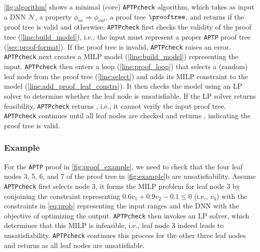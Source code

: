 \documentclass[oneside,11pt,dvipsnames]{book}
\newcommand{\nnproofcheck}{\texttt{APTPcheck}}
\newcommand{\nnproofformat}{\texttt{APTP}}
\newcommand{\mycomment}[3][\color{blue}]{{#1{{#2}: {#3}}}}
\newcommand{\tvn}[1]{\mycomment{TVN}{#1}}{}
\begin{document}
\autoref{fig:algorithm} shows a minimal (core)  \nnproofcheck{} algorithm, which takes as input a DNN $\mathcal{N}$, a property $\phi_{in} \Rightarrow \phi_{out}$, a proof tree $\prooftree$, and returns \certified if the proof tree is valid and \uncertified otherwise. 
\nnproofcheck{} first checks the validity of the proof tree (\autoref{line:build_model}), i.e., the input must represent a proper \nnproofformat{} proof tree (\autoref{sec:proof-format}).  
If the proof tree is invalid, \nnproofcheck{} raises an error.
\nnproofcheck{} next creates a MILP model (\autoref{line:build_model}) representing the input. %
\nnproofcheck{} then enters a loop (\autoref{line:proof_loop}) that selects a (random) leaf node from the proof tree (\autoref{line:select}) and adds its MILP constraint to the model (\autoref{line:add_proof_leaf_constrs}). It then checks the model using an LP solver to determine whether the leaf node is unsatisfiable. If the LP solver returns feasibility, \nnproofcheck{} returns \uncertified, i.e., it cannot verify the input proof tree. 
\nnproofcheck{} continues until all leaf nodes are checked and returns \certified, indicating the proof tree is valid.



\subsubsection{Example} For the \nnproofformat{} proof in \autoref{fig:proof_example}, we need to check that the four leaf nodes 3, 5, 6, and 7 of the proof tree in \autoref{fig:example}b are unsatisfiability. Assume \nnproofcheck{} first selects node 3, it forms the MILP problem for leaf node 3 by conjoining the constraint representing $0.6v_1 + 0.9v_2 - 0.1 \le 0$ (i.e., $\overline{v_4}$) %
with the constraints in \autoref{eq:prob} representing the input ranges and the DNN with the objective of optimizing the output. \nnproofcheck{} then invokes an LP solver, which determines that this MILP is infeasible, i.e., leaf node 3 indeed leads to unsatisfiability. \nnproofcheck{} continues this process for the other three leaf nodes and returns \certified as all leaf nodes are unsatisfiable.
\end{document}
